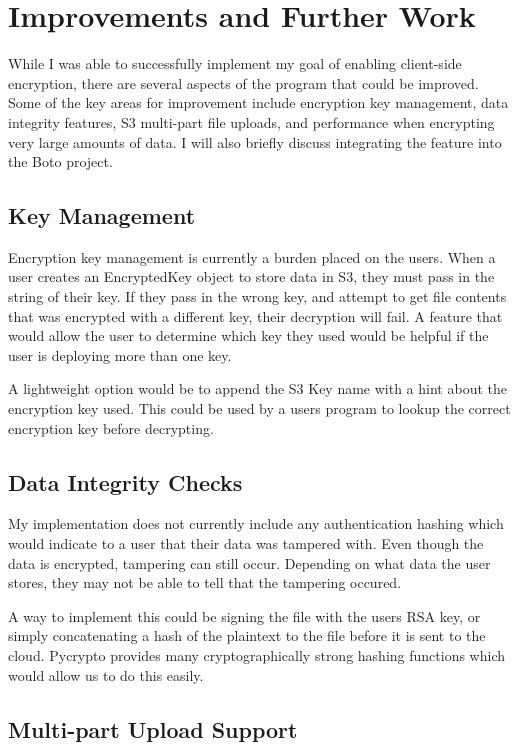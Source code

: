\section{Improvements and Further Work}

While I was able to successfully implement my goal of enabling client-side encryption, there are several aspects
of the program that could be improved. Some of the key areas for improvement include encryption key management,
data integrity features, S3 multi-part file uploads, and performance when encrypting very large amounts of data.
I will also briefly discuss integrating the feature into the Boto project.

\subsection{Key Management}
Encryption key management is currently a burden placed on the users. When a user creates an EncryptedKey object to store data in S3, they must pass in the string of their key. If they pass in the wrong key, and attempt to get file contents that was encrypted with a different key, their decryption will fail. A feature that would allow the user to determine which key they used would be helpful if the user is deploying more than one key.

A lightweight option would be to append the S3 Key name with a hint about the encryption key used. This could be used 
by a users program to lookup the correct encryption key before decrypting. 

\subsection{Data Integrity Checks}
My implementation does not currently include any authentication hashing which would indicate to a user that their data was tampered with.
Even though the data is encrypted, tampering can still occur. Depending on what data the user stores, they may not be able to tell that
the tampering occured.

A way to implement this could be signing the file with the users RSA key, or simply concatenating a hash of the plaintext to the file before it is sent to the cloud. Pycrypto provides many cryptographically strong hashing functions which would allow us to do this easily.

\subsection{Multi-part Upload Support}

